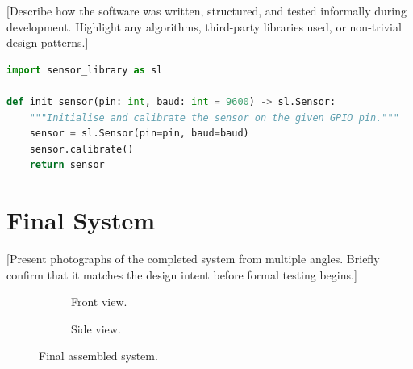 [Describe how the software was written, structured, and tested
informally during development. Highlight any algorithms, third-party
libraries used, or non-trivial design patterns.]

\begin{lstlisting}[language=Python,
                   caption={Sensor initialisation routine.},
                   label=lst:sensor-init]
import sensor_library as sl

def init_sensor(pin: int, baud: int = 9600) -> sl.Sensor:
    """Initialise and calibrate the sensor on the given GPIO pin."""
    sensor = sl.Sensor(pin=pin, baud=baud)
    sensor.calibrate()
    return sensor
\end{lstlisting}

\section{Final System}
\label{sec:final-system}

[Present photographs of the completed system from multiple angles.
Briefly confirm that it matches the design intent before formal
testing begins.]

\begin{figure}[H]
    \centering
    \begin{subfigure}[b]{0.45\textwidth}
        \centering
        \caption{Front view.}
    \end{subfigure}
    \hfill
    \begin{subfigure}[b]{0.45\textwidth}
        \centering
        \caption{Side view.}
    \end{subfigure}
    \caption{Final assembled system.}
    \label{fig:final-system}
\end{figure}
